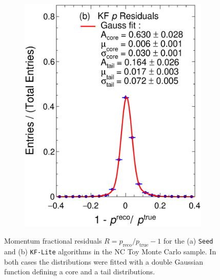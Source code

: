\begin{figure}[t]
\begin{subfigure}[b]{0.48\textwidth}
         \includegraphics[width=\textwidth]{figures/ch4-KF_NDGArLite/Toy/NoCorr/pResKF_doublegauss.eps}
         \caption{}
         \label{fig:ToyResP_GArLite_NoCorr_KF}
     \end{subfigure}
        \caption[Momentum fractional residuals for the (a) \texttt{Seed} and (b) \texttt{KF-Lite} algorithms in the NC Toy Monte Carlo sample.]{Momentum fractional residuals $R=p_{\text{reco}}/p_{\text{true}} - 1$ for the (a) \texttt{Seed} and (b) \texttt{KF-Lite} algorithms in the NC Toy Monte Carlo sample. In both cases the distributions were fitted with a double Gaussian function defining a core and a tail distributions.} \label{fig:ToyResP_GArLite_NoCorr}
\end{figure}

